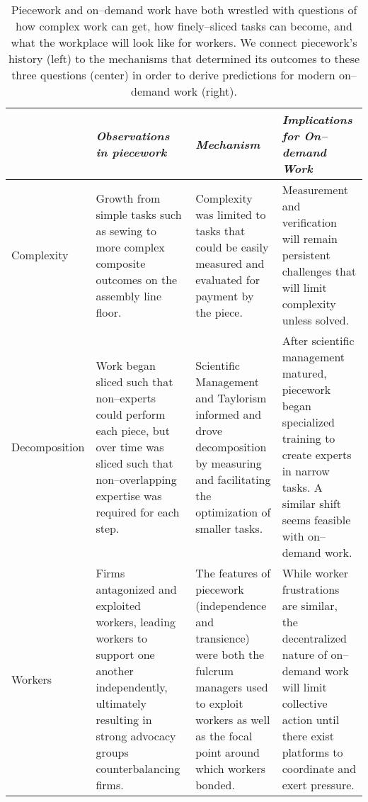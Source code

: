 \documentclass[trackingWork]{subfiles}
\begin{document}
\begin{table*}[t]
  \centering
  \begin{tabularx}{\textwidth}{l X X X}
    \toprule
    & \textit{Observations in piecework} & \textit{Mechanism} & \textit{Implications for On--demand Work} \\
    \midrule
    {Complexity} &
    \small{Growth from simple tasks such as sewing to more complex composite outcomes on the assembly line floor.} &
    \small{Complexity was limited to tasks that could be easily measured and evaluated for payment by the piece.} &
    \small{Measurement and verification will remain persistent challenges that will limit complexity unless solved.} \\ \hline

    {Decomposition} &
    \small{Work began sliced such that non--experts could perform each piece, but over time was sliced such that non--overlapping expertise was required for each step.} &
    \small{Scientific Management and Taylorism informed and drove decomposition by measuring and facilitating the optimization of smaller tasks.} &
    \small{After scientific management matured, piecework began  specialized training to create experts in narrow tasks. A similar shift seems feasible with on--demand work.} \\ \hline

    {Workers} &
    \small{Firms antagonized and exploited workers, leading workers to support one another independently, ultimately resulting in strong advocacy groups counterbalancing firms.} &
    \small{The features of piecework (independence and transience) were both the fulcrum managers used to exploit workers as well as the focal point around which workers bonded.} &
    \small{While worker frustrations are similar, the decentralized nature of on--demand work will limit collective action until there exist platforms to coordinate and exert pressure.} \\ 
    \bottomrule
  \end{tabularx}
  \label{tab:overview}
  \caption{Piecework and on--demand work have both wrestled with questions of how complex work can get, how finely--sliced tasks can become, and what the workplace will look like for workers. We connect piecework's history (left) to the mechanisms that determined its outcomes to these three questions (center) in order to derive predictions for modern on--demand work (right). }
\end{table*}
\end{document}
